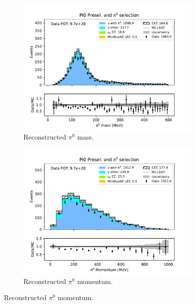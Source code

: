 \begin{figure}[H]
    \centering
    \begin{subfigure}{0.33\linewidth}
        \includegraphics[width=\linewidth]{technote/Sidebands/Figures/TwoShowerSideband/two_shr_sideband_pi0_mass_Y_corr_run1234b4c4d_PI0_PI0.pdf}
        \caption{Reconstructed $\pi^0$ mass.}
    \end{subfigure}%
    \begin{subfigure}{0.33\linewidth}
        \includegraphics[width=\linewidth]{technote/Sidebands/Figures/TwoShowerSideband/two_shr_sideband_pi0momentum_run1234b4c4d_PI0_PI0.pdf}
        \caption{Reconstructed $\pi^0$ momentum.}
    \end{subfigure}%

\end{figure}
